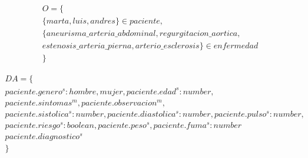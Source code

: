 \documentclass[10pt, a4paper,spanish]{article}
\begin{document}
			\begin{multline*}
				O = \{ \\
					\{marta, luis, andres\} \in paciente, \\
					\{aneurisma\_arteria\_abdominal, regurgitacion\_aortica, \\
					estenosis\_arteria\_pierna, arterio\_esclerosis \} \in enfermedad \\
				\}
			\end{multline*}

			\begin{multline*}
				DA = \{ \\
					paciente.genero^s:{hombre, mujer}, paciente.edad^s:number, \\
					paciente.sintomas^m, paciente.observacion^m, \\
					paciente.sistolica^s:number, paciente.diastolica^s:number, paciente.pulso^s:number, \\
					paciente.riesgo^s:boolean, paciente.peso^s, paciente.fuma^s:number \\
					paciente.diagnostico^s \\
				\}
			\end{multline*}
\end{document}
